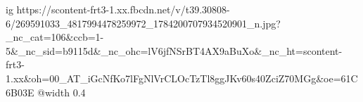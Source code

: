  
 
 
 
 

\ifcmt
  ig https://scontent-frt3-1.xx.fbcdn.net/v/t39.30808-6/269591033_4817994478259972_1784200707934520901_n.jpg?_nc_cat=106&ccb=1-5&_nc_sid=b9115d&_nc_ohc=lV6jfNSrBT4AX9aBuXo&_nc_ht=scontent-frt3-1.xx&oh=00_AT_iGcNfKo7lFgNlVrCLOcTzTl8ggJKv60s40ZciZ70MGg&oe=61C6B03E
  @width 0.4
\fi
